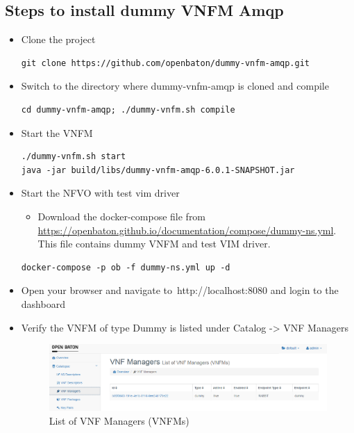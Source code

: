 			\subsection*{Steps to install dummy VNFM Amqp}
			\begin{itemize}
				
				\item Clone the project
				\begin{lstlisting}
git clone https://github.com/openbaton/dummy-vnfm-amqp.git 
				\end{lstlisting}
				
				\item Switch to the directory where dummy-vnfm-amqp is cloned and compile
				\begin{lstlisting}
cd dummy-vnfm-amqp; ./dummy-vnfm.sh compile
				\end{lstlisting}
				
				\item Start the VNFM
				\begin{lstlisting}
./dummy-vnfm.sh start
java -jar build/libs/dummy-vnfm-amqp-6.0.1-SNAPSHOT.jar
				\end{lstlisting}
				
				\item Start the NFVO with test vim driver
				\begin{itemize}
					\item Download the docker-compose file from \hyperlink{name}{https://openbaton.github.io/documentation/compose/dummy-ns.yml}. This file contains dummy VNFM and test VIM driver.
				\end{itemize}
				\begin{lstlisting}
docker-compose -p ob -f dummy-ns.yml up -d
				\end{lstlisting}
				
				\item Open your browser and navigate to http://localhost:8080 and login to the dashboard
				\item Verify the VNFM of type Dummy is listed under Catalog -> VNF Managers
				\begin{figure} [h]
					\centering
					\includegraphics[width=0.7\linewidth]{figures/VNFMList}
					\caption{List of VNF Managers (VNFMs)}
					\label{fig:VNFMList}
				\end{figure}
			\end{itemize}
			
